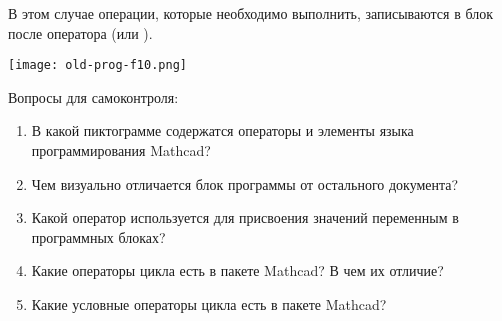 В этом случае операции, которые необходимо выполнить, записываются в блок после оператора  (или ).

\begin{center}
	\texttt{[image: old-prog-f10.png]}
\end{center}


Вопросы для самоконтроля:
\begin{enumerate}
	\item В какой пиктограмме содержатся операторы и элементы языка программирования Mathcad?
	\item Чем визуально отличается блок программы от остального документа?
	\item Какой оператор используется для присвоения значений переменным в программных блоках?
	\item Какие операторы цикла есть в пакете Mathcad? В чем их отличие?
	\item Какие условные операторы цикла есть в пакете Mathcad?
\end{enumerate}
